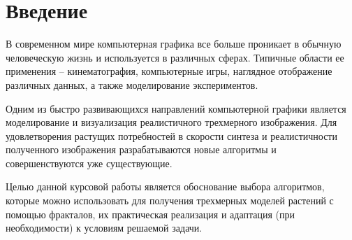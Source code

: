 \chapter*{Введение}

В современном мире компьютерная графика все больше проникает в обычную человеческую жизнь и используется в различных сферах. Типичные области ее применения – кинематография, компьютерные игры, наглядное отображение различных данных, а также моделирование экспериментов.

Одним из быстро развивающихся направлений компьютерной графики является моделирование и визуализация реалистичного трехмерного изображения. Для удовлетворения растущих потребностей в скорости синтеза и реалистичности полученного изображения разрабатываются новые алгоритмы и совершенствуются уже существующие.

Целью данной курсовой работы является обоснование выбора алгоритмов, которые можно использовать для получения трехмерных моделей растений с помощью фракталов, их практическая реализация и адаптация (при необходимости) к условиям решаемой задачи.
